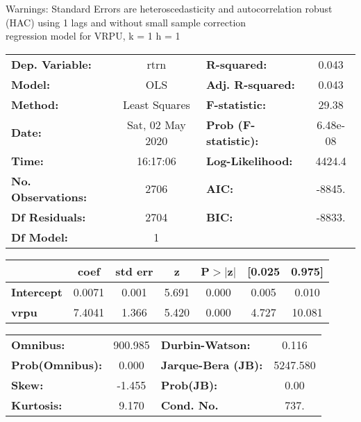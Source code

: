 Warnings: \newline
 [1] Standard Errors are heteroscedasticity and autocorrelation robust (HAC) using 1 lags and without small sample correction\\ 

regression model for VRPU, k = 1 h = 1\begin{center}
\begin{tabular}{lclc}
\toprule
\textbf{Dep. Variable:}    &       rtrn       & \textbf{  R-squared:         } &     0.043   \\
\textbf{Model:}            &       OLS        & \textbf{  Adj. R-squared:    } &     0.043   \\
\textbf{Method:}           &  Least Squares   & \textbf{  F-statistic:       } &     29.38   \\
\textbf{Date:}             & Sat, 02 May 2020 & \textbf{  Prob (F-statistic):} &  6.48e-08   \\
\textbf{Time:}             &     16:17:06     & \textbf{  Log-Likelihood:    } &    4424.4   \\
\textbf{No. Observations:} &        2706      & \textbf{  AIC:               } &    -8845.   \\
\textbf{Df Residuals:}     &        2704      & \textbf{  BIC:               } &    -8833.   \\
\textbf{Df Model:}         &           1      & \textbf{                     } &             \\
\bottomrule
\end{tabular}
\begin{tabular}{lcccccc}
                   & \textbf{coef} & \textbf{std err} & \textbf{z} & \textbf{P$> |$z$|$} & \textbf{[0.025} & \textbf{0.975]}  \\
\midrule
\textbf{Intercept} &       0.0071  &        0.001     &     5.691  &         0.000        &        0.005    &        0.010     \\
\textbf{vrpu}      &       7.4041  &        1.366     &     5.420  &         0.000        &        4.727    &       10.081     \\
\bottomrule
\end{tabular}
\begin{tabular}{lclc}
\textbf{Omnibus:}       & 900.985 & \textbf{  Durbin-Watson:     } &    0.116  \\
\textbf{Prob(Omnibus):} &   0.000 & \textbf{  Jarque-Bera (JB):  } & 5247.580  \\
\textbf{Skew:}          &  -1.455 & \textbf{  Prob(JB):          } &     0.00  \\
\textbf{Kurtosis:}      &   9.170 & \textbf{  Cond. No.          } &     737.  \\
\bottomrule
\end{tabular}
\end{center}

